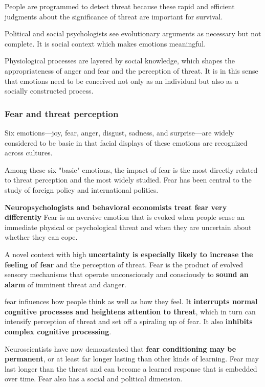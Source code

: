 People are programmed to detect threat because these rapid and efficient judgments about the significance of threat are important for survival.

Political and social psychologists see evolutionary arguments as necessary but not complete. It is social context which makes emotions meaningful.

Physiological processes are layered by social knowledge, which shapes the appropriateness of anger and fear and the perception of threat. It is in this sense that emotions need to be conceived not only as an individual but also as a socially constructed process.

\subsubsection{Fear and threat perception}
Six emotions—joy, fear, anger, disgust, sadness, and surprise—are widely considered to be basic in that facial displays of these emotions are recognized across cultures.

Among these six "basic" emotions, the impact of fear is the most directly related to threat perception and the most widely studied. Fear has been central to the study of foreign policy and international politics.

\textbf{Neuropsychologists and behavioral economists treat fear very differently}
Fear is an aversive emotion that is evoked when people sense an immediate physical or psychological threat and when they are uncertain about whether they can cope.

A novel context with high \textbf{uncertainty is especially likely to increase the feeling of fear} and the perception of threat. Fear is the product of evolved sensory mechanisms that operate unconsciously and consciously to \textbf{sound an alarm} of imminent threat and danger.

fear infiuences how people think as well as how they feel. It \textbf{interrupts normal cognitive processes and heightens attention to threat}, which in turn can intensify perception of threat and set off a spiraling up of fear. It also \textbf{inhibits complex cognitive processing}.

Neuroscientists have now demonstrated that \textbf{fear conditioning may be permanent}, or at least far longer lasting than other kinds of learning. Fear may last longer than the threat and can become a learned response that is embedded over time. Fear also has a social and political dimension.

